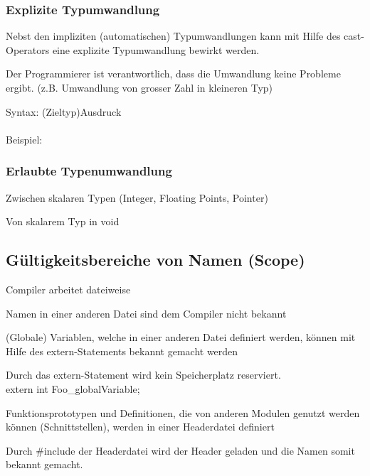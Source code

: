 				\begin{minipage}[t]{9 cm}
					\subsubsection{Explizite Typumwandlung}
						\begin{compactitem}
							\item Nebst den impliziten (automatischen) Typumwandlungen kann mit Hilfe des
							cast-Operators eine explizite Typumwandlung bewirkt werden.
							\item Der Programmierer ist verantwortlich, dass die Umwandlung keine Probleme
							ergibt.
							(z.B. Umwandlung von grosser Zahl in kleineren Typ)
							\item Syntax:
							(Zieltyp)Ausdruck
							\\\\Beispiel:
							
						\end{compactitem}
					\subsubsection{Erlaubte Typenumwandlung}
						\begin{compactitem}
							\item Zwischen skalaren Typen (Integer, Floating Points, Pointer)
							\item Von skalarem Typ in void
						\end{compactitem}
				\end{minipage}
			\subsection{Gültigkeitsbereiche von Namen (Scope)}				
				\begin{compactitem}
					\item Compiler arbeitet dateiweise
					\item Namen in einer anderen Datei sind dem Compiler nicht bekannt
					\item (Globale) Variablen, welche in einer anderen Datei definiert werden, können 
					mit Hilfe des extern-Statements bekannt gemacht werden
					\item Durch das extern-Statement wird kein Speicherplatz reserviert.\\
					extern int Foo\_globalVariable;
					\item Funktionsprototypen und Definitionen, die von anderen Modulen genutzt
					werden können (Schnittstellen), werden in einer Headerdatei definiert
					\item Durch \#include der Headerdatei wird der Header geladen und die Namen somit bekannt gemacht.
				\end{compactitem}